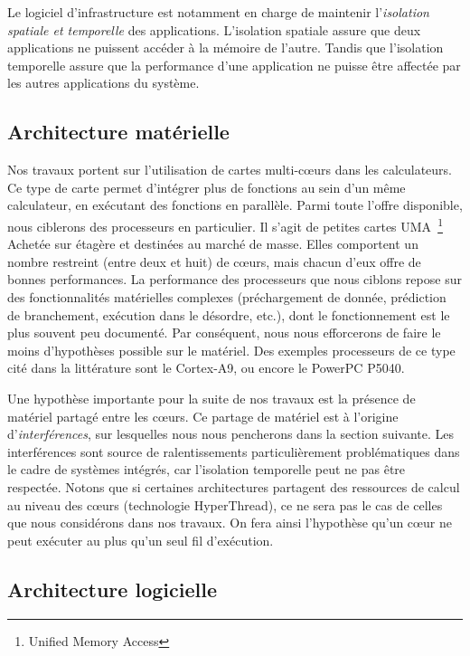Le logiciel d'infrastructure est notamment en charge de maintenir l'\emph{isolation spatiale et temporelle} des applications.
L'isolation spatiale assure que deux applications ne puissent accéder à la mémoire de l'autre.
Tandis que l'isolation temporelle assure que la performance d'une application ne puisse être affectée par les autres applications du système.

\subsection{Architecture matérielle}

Nos travaux portent sur l'utilisation de cartes multi-cœurs dans les calculateurs.
Ce type de carte permet d'intégrer plus de fonctions au sein d'un même calculateur, en exécutant des fonctions en parallèle.
Parmi toute l'offre disponible, nous ciblerons des processeurs en particulier.
Il s'agit de petites cartes UMA~\footnote{Unified Memory Access} Achetée sur étagère et destinées au marché de masse.
Elles comportent un nombre restreint (entre deux et huit) de cœurs, mais chacun d'eux offre de bonnes performances.
La performance des processeurs que nous ciblons repose sur des fonctionnalités matérielles complexes (préchargement de donnée, prédiction de branchement, exécution dans le désordre, etc.), dont le fonctionnement est le plus souvent peu documenté.
Par conséquent, nous nous efforcerons de faire le moins d'hypothèses possible sur le matériel.
Des exemples processeurs de ce type cité dans la littérature sont le Cortex-A9, ou encore le PowerPC P5040.

Une hypothèse importante pour la suite de nos travaux est la présence de matériel partagé entre les cœurs.
Ce partage de matériel est à l'origine d'\emph{interférences}, sur lesquelles nous nous pencherons dans la section suivante.
Les interférences sont source de ralentissements particulièrement problématiques dans le cadre de systèmes intégrés, car l'isolation temporelle peut ne pas être respectée.
Notons que si certaines architectures partagent des ressources de calcul au niveau des cœurs (technologie HyperThread), ce ne sera pas le cas de celles que nous considérons dans nos travaux.
On fera ainsi l'hypothèse qu'un cœur ne peut exécuter au plus qu'un seul fil d'exécution.

\subsection{Architecture logicielle}

